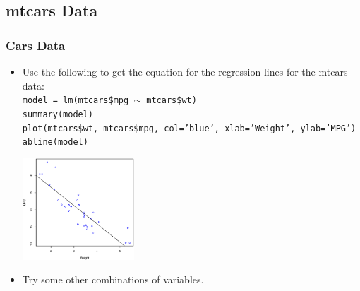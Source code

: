 \documentclass[t]{beamer}
\begin{document}
\subsection{mtcars Data}
\begin{frame}\frametitle{Cars Data}
{\scriptsize

\begin{itemize}
\item Use the following to get the equation for the regression lines for the mtcars data:\\[3pt]
   \texttt{model = lm(mtcars\$mpg $\sim$  mtcars\$wt)}\\[3pt]
   \texttt{summary(model)}\\[3pt]
   \texttt{plot(mtcars\$wt, mtcars\$mpg, col='blue', xlab='Weight', ylab='MPG')}\\
   \texttt{abline(model)}\vspace{-15pt}
\begin{center}
\includegraphics[height=1.5in]{mtcars1.eps}
\end{center}
\item Try some other combinations of variables.
\end{itemize}
}
\label{lastpage}
\end{frame}
\end{document}
